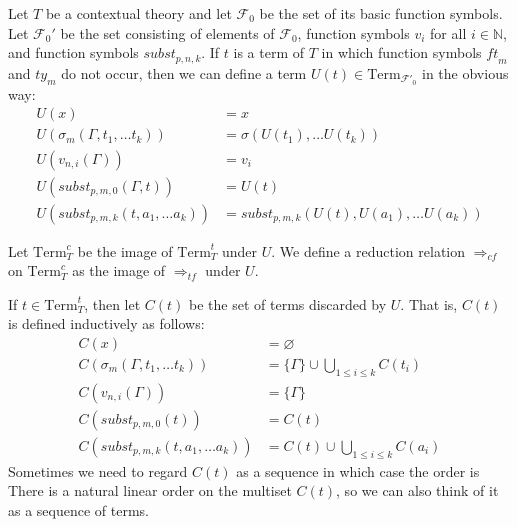 \documentclass[reqno]{amsart}
\theoremstyle{definition}
\theoremstyle{remark}
\newcommand{\Term}{\mathrm{Term}}
\newcommand{\subst}{\mathit{subst}}
\newcommand{\ft}{\mathit{ft}}
\newcommand{\ty}{\mathit{ty}}
\numberwithin{figure}{section}
\begin{document}
Let $T$ be a contextual theory and let $\mathcal{F}_0$ be the set of its basic function symbols.
Let $\mathcal{F}_0'$ be the set consisting of elements of $\mathcal{F}_0$, function symbols $v_i$ for all $i \in \mathbb{N}$, and function symbols $\subst_{p,n,k}$.
If $t$ is a term of $T$ in which function symbols $\ft_m$ and $\ty_m$ do not occur, then we can define a term $U(t) \in \Term_{\mathcal{F}'_0}$ in the obvious way:
\begin{align*}
U(x) & = x \\
U(\sigma_m(\Gamma, t_1, \ldots t_k)) & = \sigma(U(t_1), \ldots U(t_k)) \\
U(v_{n,i}(\Gamma)) & = v_i \\
U(\subst_{p,m,0}(\Gamma,t)) & = U(t) \\
U(\subst_{p,m,k}(t, a_1, \ldots a_k)) & = \subst_{p,m,k}(U(t), U(a_1), \ldots U(a_k))
\end{align*}

Let $\Term_T^c$ be the image of $\Term_T^t$ under $U$.
We define a reduction relation $\Rightarrow_{cf}$ on $\Term_T^c$ as the image of $\Rightarrow_{tf}$ under $U$.

If $t \in \Term_T^t$, then let $C(t)$ be the set of terms discarded by $U$.
That is, $C(t)$ is defined inductively as follows:
\begin{align*}
C(x) & = \varnothing \\
C(\sigma_m(\Gamma, t_1, \ldots t_k)) & = \{ \Gamma \} \cup \bigcup_{1 \leq i \leq k} C(t_i) \\
C(v_{n,i}(\Gamma)) & = \{ \Gamma \} \\
C(\subst_{p,m,0}(t)) & = C(t) \\
C(\subst_{p,m,k}(t, a_1, \ldots a_k)) & = C(t) \cup \bigcup_{1 \leq i \leq k} C(a_i)
\end{align*}
Sometimes we need to regard $C(t)$ as a sequence in which case the order is 
There is a natural linear order on the multiset $C(t)$, so we can also think of it as a sequence of terms.
\end{document}
